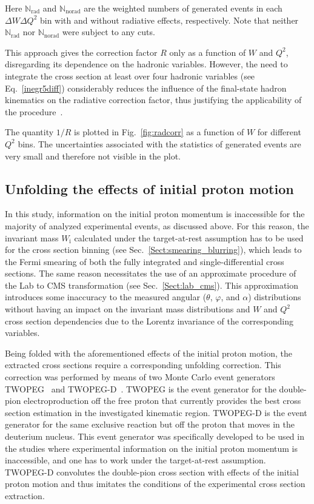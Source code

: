 \documentclass[prc,twocolumn,superscriptaddress,showpacs,amssymb,amsmath,amsfonts,aps,nofootinbib]{revtex4-1}
\begin{document}
Here $\mathbb{N}_{\text{rad}}$ and $\mathbb{N}_{\text{norad}}$ are the weighted numbers of generated events in each $\Delta W \Delta Q^{2}$ bin with and without radiative effects, respectively. Note that neither $\mathbb{N}_{\text{rad}}$ nor $\mathbb{N}_{\text{norad}}$ were subject to any cuts.


This approach gives the correction factor $R$ only as a function of $W$ and $Q^{2}$, disregarding its dependence on the hadronic variables. However, the need to integrate the cross section at least over four hadronic variables (see Eq.\!~\eqref{inegr5diff}) considerably reduces the influence of the final-state hadron kinematics on the radiative correction factor, thus justifying the applicability of the procedure~\cite{Mo:1968cg,twopeg,twopeg-d}.

The quantity $1/R$ is plotted in Fig.\!~\ref{fig:radcorr} as a function of $W$ for different $Q^{2}$ bins. The uncertainties associated with the statistics of generated events are very small and therefore not visible in the plot.



\subsection{Unfolding the effects of initial proton motion}
\label{Sect:fermi_corr}


In this study, information on the initial proton momentum is inaccessible for the majority of analyzed experimental events, as discussed above. For this reason, the invariant mass $W_{\textrm{i}}$ calculated under the target-at-rest assumption has to be used for the cross section binning (see Sec.\!~\ref{Sect:smearing_blurring}), which leads to the Fermi smearing of both the fully integrated and single-differential cross sections. The same reason necessitates the use of an approximate procedure of the Lab to CMS transformation (see Sec.\!~\ref{Sect:lab_cms}). This approximation introduces some inaccuracy to the measured angular ($\theta$, $\varphi$, and $\alpha$) distributions without having an impact on the invariant mass distributions and $W$ and $Q^{2}$ cross section dependencies due to the Lorentz invariance of the corresponding variables. 


Being folded with the aforementioned effects of the initial proton motion, the extracted cross sections require a corresponding unfolding correction. This correction was performed by means of two Monte Carlo event generators TWOPEG~\cite{twopeg} and TWOPEG-D~\cite{twopeg-d}. TWOPEG is the event generator for the double-pion electroproduction off the free proton that currently provides the best cross section estimation in the investigated kinematic region. TWOPEG-D is the event generator for the same exclusive reaction but off the proton that moves in the deuterium nucleus. This event generator was specifically developed to be used in the studies where experimental information on the initial proton momentum is inaccessible, and one has to work under the target-at-rest assumption. TWOPEG-D convolutes the double-pion cross section with effects of the initial proton motion and thus imitates the conditions of the experimental cross section extraction.
\end{document}
